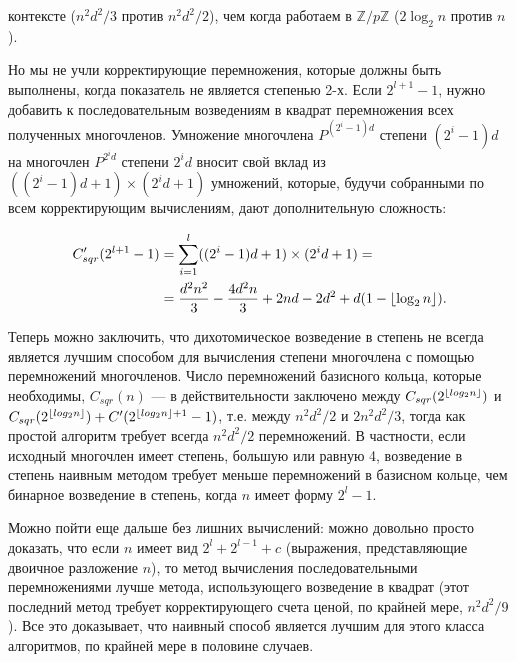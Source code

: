\documentclass{../../template/mai_book}
\DeclarePairedDelimiter{\floor}{\lfloor}{\rfloor}
\begin{document}
\newpage


\noindent
контексте ($n^2 d^2 / 3$ против $n^2 d^2 / 2$), чем когда работаем в $\mathbb{Z} / p \mathbb{Z}$ ($2 \log_2 n$ против $n$).

Но мы не учли корректирующие перемножения, которые должны быть выполнены, когда показатель не является степенью 2-х. Если $2^{l + 1} - 1$, нужно добавить к последовательным возведениям в квадрат перемножения всех полученных многочленов. Умножение многочлена $P^{(2^i - 1)d}$ степени $(2^i - 1)d$ на многочлен $P^{2^i d}$ степени $2^i d$ вносит свой вклад из $((2^i - 1)d + 1) \times (2^i d + 1)$ умножений, которые, будучи собранными по всем корректирующим вычислениям, дают дополнительную сложность:

\begin{equation*}
	\begin{split}
	C_{sqr}'(2^{l + 1} - 1) &= \sum_{i = 1}^l ((2^i - 1)d + 1) \times (2^i d + 1) =
	\\
	&= \frac{d^2 n^2}{3} - \frac{4d^2 n}{3} + 2nd -2d^2 + d(1 - \floor{\log_2 n} ).
	\end{split}
\end{equation*}

\noindent
Теперь можно заключить, что дихотомическое возведение в степень не всегда является лучшим способом для вычисления степени многочлена с помощью перемножений многочленов. Число перемножений базисного кольца, которые необходимы, $C_{sqr}(n)$ — в действительности заключено между $C_{sqr}(2^{\floor{log_2 n}})$ и $C_{sqr}(2^{\floor{log_2 n}}) + C'(2^{\floor{log_2 n} + 1} - 1)$, т.е. между $n^2 d^2 / 2$ и $2n^2 d^2 / 3$, тогда как простой алгоритм требует всегда $n^2 d^2 / 2$ перемножений. В частности, если исходный многочлен имеет степень, большую или равную 4, возведение в степень наивным методом  требует меньше перемножений в базисном кольце, чем бинарное возведение в степень, когда $n$ имеет форму $2^l - 1$. \newline


Можно пойти еще дальше без лишних вычислений: можно довольно просто доказать, что если $n$ имеет вид $2^l + 2^{l - 1} + c$ (выражения, представляющие двоичное разложение $n$), то метод вычисления последовательными перемножениями лучше метода, использующего возведение в квадрат (этот последний метод требует корректирующего счета ценой, по крайней мере, $n^2 d^2 / 9$). Все это доказывает, что наивный способ является лучшим для этого класса алгоритмов, по крайней мере в половине случаев. \newline
\end{document}
